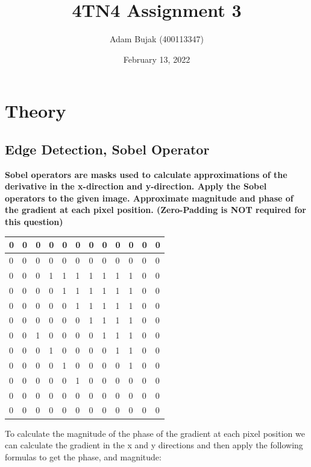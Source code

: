 \documentclass[12pt, letterpaper]{article}
\title{4TN4 Assignment 3}
\author{Adam Bujak (400113347)}
\date{February 13, 2022}
\begin{document}
\maketitle

\section{Theory}

\subsection{Edge Detection, Sobel Operator}

\textbf{Sobel operators are masks used to calculate approximations of the derivative in the x-direction and y-direction. Apply the Sobel operators to the given image. Approximate magnitude and phase of the gradient at each pixel position. (Zero-Padding is NOT required for this question)}

\begin{table}[!ht]
    \centering
    \begin{tabular}{|l|l|l|l|l|l|l|l|l|l|l|l|}
    \hline
        0 & 0 & 0 & 0 & 0 & 0 & 0 & 0 & 0 & 0 & 0 & 0  \\ \hline
        0 & 0 & 0 & 0 & 0 & 0 & 0 & 0 & 0 & 0 & 0 & 0  \\ \hline
        0 & 0 & 0 & 1 & 1 & 1 & 1 & 1 & 1 & 1 & 0 & 0  \\ \hline
        0 & 0 & 0 & 0 & 1 & 1 & 1 & 1 & 1 & 1 & 0 & 0  \\ \hline
        0 & 0 & 0 & 0 & 0 & 1 & 1 & 1 & 1 & 1 & 0 & 0  \\ \hline
        0 & 0 & 0 & 0 & 0 & 0 & 1 & 1 & 1 & 1 & 0 & 0  \\ \hline
        0 & 0 & 1 & 0 & 0 & 0 & 0 & 1 & 1 & 1 & 0 & 0  \\ \hline
        0 & 0 & 0 & 1 & 0 & 0 & 0 & 0 & 1 & 1 & 0 & 0  \\ \hline
        0 & 0 & 0 & 0 & 1 & 0 & 0 & 0 & 0 & 1 & 0 & 0  \\ \hline
        0 & 0 & 0 & 0 & 0 & 1 & 0 & 0 & 0 & 0 & 0 & 0  \\ \hline
        0 & 0 & 0 & 0 & 0 & 0 & 0 & 0 & 0 & 0 & 0 & 0  \\ \hline
        0 & 0 & 0 & 0 & 0 & 0 & 0 & 0 & 0 & 0 & 0 & 0 \\ \hline
    \end{tabular}
\end{table}

To calculate the magnitude of the phase of the gradient at each pixel position we can calculate the gradient in the x and y directions and then apply the following formulas to get the phase, and magnitude:
\end{document}
